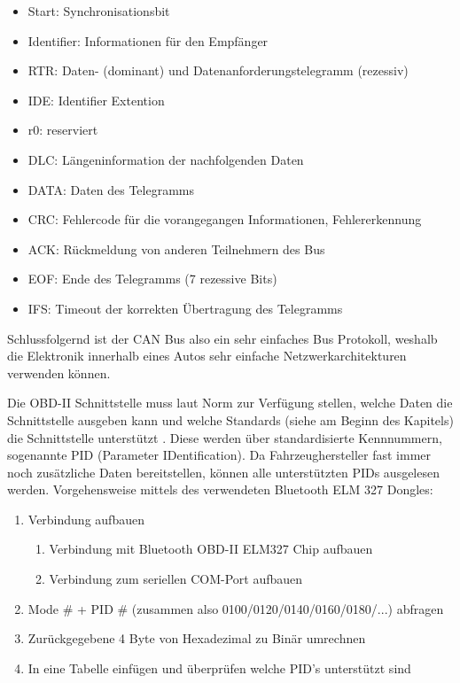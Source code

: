 \begin{itemize}
	\item Start: Synchronisationsbit
	\item Identifier: Informationen für den Empfänger
	\item RTR: Daten- (dominant) und Datenanforderungstelegramm (rezessiv)
	\item IDE: Identifier Extention
	\item r0: reserviert
	\item DLC: Längeninformation der nachfolgenden Daten
	\item DATA: Daten des Telegramms
	\item CRC: Fehlercode für die vorangegangen Informationen, Fehlererkennung
	\item ACK: Rückmeldung von anderen Teilnehmern des Bus
	\item EOF: Ende des Telegramms (7 rezessive Bits)
	\item IFS: Timeout der korrekten Übertragung des Telegramms \cite{SIMR.CH3-obd2.CANBus}
\end{itemize}
Schlussfolgernd ist der CAN Bus also ein sehr einfaches Bus Protokoll, weshalb die Elektronik innerhalb eines Autos sehr einfache Netzwerkarchitekturen verwenden können.

Die OBD-II Schnittstelle muss laut Norm zur Verfügung stellen, welche Daten die Schnittstelle ausgeben kann und welche Standards (siehe am Beginn des Kapitels) die Schnittstelle unterstützt \cite{SIMR.CH2-obd2.PIDMustHave}. Diese werden über standardisierte Kennnummern, sogenannte PID (Parameter IDentification). Da Fahrzeughersteller fast immer noch zusätzliche Daten bereitstellen, können alle unterstützten PIDs ausgelesen werden. Vorgehensweise mittels des verwendeten Bluetooth ELM 327 Dongles: 

\begin{enumerate}
	\item Verbindung aufbauen
	\begin{enumerate}
		\item Verbindung mit Bluetooth OBD-II ELM327 Chip aufbauen
		\item Verbindung zum seriellen COM-Port aufbauen 
	\end{enumerate}
	\item Mode \# + PID \# (zusammen also 0100/0120/0140/0160/0180/...) abfragen
	\item Zurückgegebene 4 Byte von Hexadezimal zu Binär umrechnen
	\item In eine Tabelle einfügen und überprüfen welche PID's unterstützt sind
\end{enumerate}

